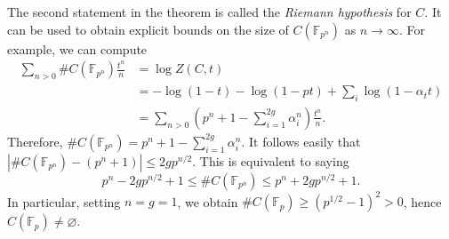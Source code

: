 \documentclass{article}
\begin{document}
The second statement in the theorem is called the \emph{Riemann hypothesis} 
for $C$. It can be used to obtain explicit bounds on the size of 
$C(\mathbb{F}_{p^n})$ as $n\to\infty$. For example, we can compute 
\begin{align*}
  \sum_{n>0} \# C(\mathbb{F}_{p^n}) \frac{t^n}{n} 
    &= \log Z(C,t) \\
    &= -\log(1-t) - \log(1-p t) + \sum_i \log(1-\alpha_t t) \\
    &= \sum_{n>0} \left(p^n+1-\sum_{i=1}^{2 g} \alpha_i^n\right) \frac{t^n}{n} \text{.}
\end{align*}
Therefore, $\# C(\mathbb{F}_{p^n}) = p^n+1-\sum_{i=1}^{2 g} \alpha_i^n$. It 
follows easily that $|\# C(\mathbb{F}_{p^n})-(p^n+1)| \leqslant 2 g p^{n/2}$. 
This is equivalent to saying 
\[
  p^n-2 g p^{n/2}+1 
    \leqslant \# C(\mathbb{F}_{p^n}) 
    \leqslant p^n + 2 g p^{n/2} + 1 \text{.}
\]
In particular, setting $n = g = 1$, we obtain 
$\# C(\mathbb{F}_p) \geqslant (p^{1/2}-1)^2>0$, hence 
$C(\mathbb{F}_p)\ne\varnothing$. 



























\end{document}
